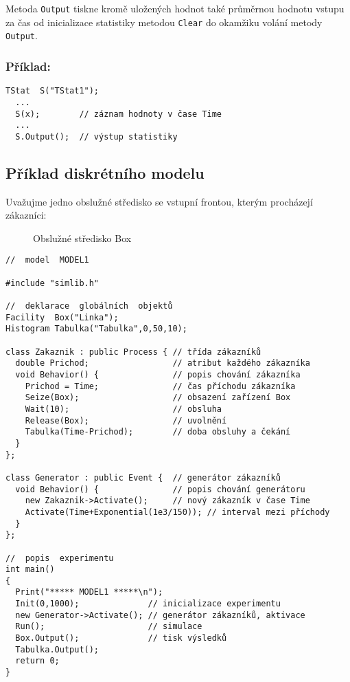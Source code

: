 \documentclass[a4paper]{article}
\begin{document}
Metoda \verb|Output| tiskne kromě uložených hodnot také průměrnou
hodnotu vstupu za čas od inicializace statistiky metodou \verb|Clear|
do okamžiku volání metody \verb|Output|.

\subsubsection*{Příklad:}

\begin{verbatim}
TStat  S("TStat1");
  ...
  S(x);        // záznam hodnoty v čase Time
  ...
  S.Output();  // výstup statistiky
\end{verbatim}



\subsection{Příklad diskrétního modelu}

Uvažujme jedno obslužné středisko se vstupní frontou, kterým
procházejí zákazníci:

%
\begin{figure}[ht]
  \begin{center}
    \caption{Obslužné středisko Box}
    \label{o5}
  \end{center}
\end{figure}

{\small
\begin{verbatim}
//  model  MODEL1

#include "simlib.h"

//  deklarace  globálních  objektů
Facility  Box("Linka");
Histogram Tabulka("Tabulka",0,50,10);

class Zakaznik : public Process { // třída zákazníků
  double Prichod;                 // atribut každého zákazníka
  void Behavior() {               // popis chování zákazníka
    Prichod = Time;               // čas příchodu zákazníka
    Seize(Box);                   // obsazení zařízení Box
    Wait(10);                     // obsluha
    Release(Box);                 // uvolnění
    Tabulka(Time-Prichod);        // doba obsluhy a čekání
  }
};

class Generator : public Event {  // generátor zákazníků
  void Behavior() {               // popis chování generátoru
    new Zakaznik->Activate();     // nový zákazník v čase Time
    Activate(Time+Exponential(1e3/150)); // interval mezi příchody
  }
};

//  popis  experimentu
int main()
{
  Print("***** MODEL1 *****\n");
  Init(0,1000);              // inicializace experimentu
  new Generator->Activate(); // generátor zákazníků, aktivace
  Run();                     // simulace
  Box.Output();              // tisk výsledků
  Tabulka.Output();
  return 0;
}
\end{verbatim}
}
\end{document}
